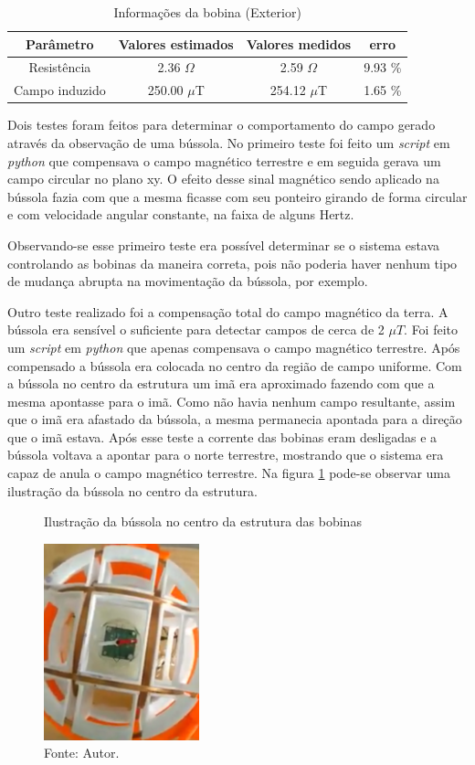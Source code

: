 \begin{table}[H]
    \centering
    \caption{Informações da bobina (Exterior)}
    \begin{tabular}{|c|c|c|c|}
     \hline
     \textbf{Parâmetro} & \textbf{Valores estimados} & \textbf{Valores medidos} & \textbf{erro}\\
     \hline
     Resistência&  2.36 $\Omega$  & 2.59 $\Omega$ & 9.93 \% \\ 
     Campo induzido &   250.00 $\mu$T  & 254.12 $\mu$T & 1.65 \% \\ \hline
     
    \end{tabular}
    \label{tab:extCoil}
\end{table}

Dois testes foram feitos para determinar o comportamento do campo gerado através da observação de uma bússola. No primeiro teste foi feito um \textit{script} em \textit{python} que compensava o campo magnético terrestre e em seguida gerava um campo circular no plano xy. O efeito desse sinal magnético sendo aplicado na bússola fazia com que a mesma ficasse com seu ponteiro girando de forma circular e com velocidade angular constante, na faixa de alguns Hertz.

Observando-se esse primeiro teste era possível determinar se o sistema estava controlando as bobinas da maneira correta, pois não poderia haver nenhum tipo de mudança abrupta na movimentação da bússola, por exemplo.

Outro teste realizado foi a compensação total do campo magnético da terra. A bússola era sensível o suficiente para detectar campos de cerca de 2 $\mu T$. Foi feito um \textit{script} em \textit{python} que apenas compensava o campo magnético terrestre. Após compensado a bússola era colocada no centro da região de campo uniforme. Com a bússola no centro da estrutura um imã era aproximado fazendo com que a mesma apontasse para o imã. Como não havia nenhum campo resultante, assim que o imã era afastado da bússola, a mesma permanecia apontada para a direção que o imã estava. Após esse teste a corrente das bobinas eram desligadas e a bússola voltava a apontar para o norte terrestre, mostrando que o sistema era capaz de anula o campo magnético terrestre. Na figura \ref{fig:compass} pode-se observar uma ilustração da bússola no centro da estrutura.


\begin{figure}[H]
    \centering
     \caption{Ilustração da bússola no centro da estrutura das bobinas}
     \includegraphics[width=0.4\textwidth]{./img/compass.png}
     \caption*{Fonte: Autor.}\label{fig:compass}
\end{figure}
